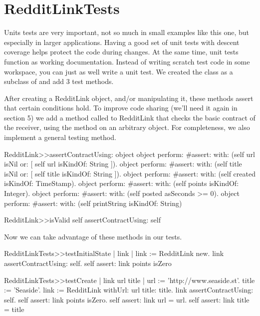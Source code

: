 \documentclass[a4paper,10pt,twoside]{book}
\begin{document}
\section{RedditLinkTests}

Units tests are very important, not so much in small examples like this one, but especially in larger applications. Having a good set of unit tests with descent coverage helps protect the code during changes. At the same time, unit tests function as working documentation. Instead of writing scratch test code in some workspace, you can just as well write a unit test. We created the class  as a subclass of  and add 3 test methods.



After creating a RedditLink object, and/or manipulating it, these methods assert that certain conditions hold. To improve code sharing (we'll need it again in section 5) we add a method called  to RedditLink that checks the basic contract of the receiver, using the method  on an arbitrary object. For completeness, we also implement a general  testing method.


\begin{code}{}
RedditLink>>assertContractUsing: object
   object perform: #assert: with: (self url isNil or: [ self url isKindOf: String ]).
   object perform: #assert: with: (self title isNil or: [ self title isKindOf: String ]).
   object perform: #assert: with: (self created isKindOf: TimeStamp).
   object perform: #assert: with: (self points isKindOf: Integer).
   object perform: #assert: with: (self posted asSeconds >= 0).
   object perform: #assert: with: (self printString isKindOf: String)
   
RedditLink>>isValid
    self assertContractUsing: self
\end{code}

Now we can take advantage of these methods in our tests.

\begin{code}{}
RedditLinkTests>>testInitialState
    | link | 
    link := RedditLink new. 
    link assertContractUsing: self. 
    self assert: link points isZero
\end{code}

\begin{code}{}
RedditLinkTests>>testCreate
    | link url title | 
    url := 'http://www.seaside.st'. 
    title := 'Seaside'. 
    link := RedditLink withUrl: url title: title. 
    link assertContractUsing: self. 
    self assert: link points isZero. 
    self assert: link url = url. 
    self assert: link title = title
\end{code}
\end{document}
